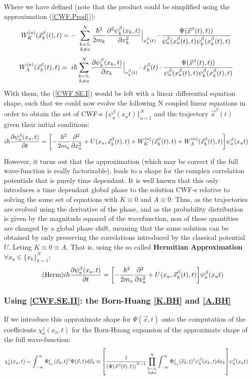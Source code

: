 \documentclass[11pt, a4paper]{article} %
\begin{document}
Where we have defined (note that the product could be simplified using the approximation (\ref{CWF.Prod})):
$$
W^{(a)}_K(\vec{x}_b^\beta (t),t)=- \ \sum_{\substack{k=1; \\ k\neq a}}^{N} \frac{\hbar^2}{2m_k}\pdv[2]{\psi_k^\beta(x_k,t)}{x_k}\Big\rvert_{x_k^\beta(t)}\cdot\frac{\Psi(\vec{x}^\beta(t),t))}{\psi^\beta_a(x_a^\beta(t),t) \psi^\beta_k(x_k^\beta(t),t)} 
$$
$$
W^{(a)}_A(\vec{x}_b^\beta (t),t)=\ i\hbar \sum_{\substack{k=1; \\ k\neq a}}^{N} \pdv{\psi_k^\beta(x_k,t)}{x_k}\Big\rvert_{x_k^\beta(t)}\cdot \dot{x}_k^\beta(t) \cdot\frac{\Psi(\vec{x}^\beta(t),t))}{\psi^\beta_a(x_a^\beta(t),t) \psi^\beta_k(x_k^\beta(t),t)}
$$
With them, the (\ref{CWF.SE.I}) would be left with a linear differential equation shape, such that we could now evolve the following N coupled linear equations in order to obtain the set of CWF-s $\{\psi_a^\beta(x_a t) \}_{a=1}^N$ and the trajectory $\vec{x}^\beta(t)$ given their initial conditions:
$$
i\hbar \pdv{\psi_a^\beta(x_a, t)}{t} = \qty[- \frac{\hbar^2}{2m_a}\pdv[2]{}{x_a} + U(x_a, \vec{x}_b^\beta(t), t)+ W^{(a)}_K(\vec{x}_b^\beta (t),t) +W^{(a)}_A(\vec{x}_b^\beta (t),t) ]\psi_a^\beta(x_a t)
$$

However, it turns out that the approximation (which may be correct if the full wave-function is really factorizable), leads to a shape for the complex correlation potentials that is purely time dependant. It is well known that this only introduces a time dependant global phase to the solution CWF-s relative to solving the same set of equations with $K\equiv 0$ and $A \equiv 0$. Thus, as the trajectories are evolved using the derivative of the phase, and as the probability distribution is given by the magnitude squared of the wavefunction, non of these quantities are changed by a global phase shift, meaning that the same solution can be obtained by only preserving the correlations introduced by the classical potential $U$. Leting $K\equiv 0 \equiv A$. That is, using the so called {\bf Hermitian Approximation} $\forall x_a \in \{ x_k\}_{k=1}^N$:
\begin{equation}\label{Herm}\tag{Herm}
i\hbar \pdv{\psi_a^\beta(x_a, t)}{t} = \qty[- \frac{\hbar^2}{2m_a}\pdv[2]{}{x_a} + U(x_a, \vec{x}_b^\beta(t), t)]\psi_a^\beta(x_a t)
\end{equation}

\subsubsection{Using \ref{CWF.SE.II}: the Born-Huang \ref{K.BH} and \ref{A.BH}}
If we introduce this approximate shape for $\Psi(\vec{x},t)$ onto the computation of the coefficients $\chi_a^j(x_a,t)$ for the Born-Huang expansion of the approximate shape of the full wave-function:
$$
\chi_a^j(x_a,t)= \int_{-\infty}^\infty \Phi_{x_a}^j(\vec{x}_b,t)^\dagger \Psi(\vec{x},t) d\vec{x}_b \simeq \qty[\frac{1}{ \qty(\Psi(\vec{x}^\beta(t),t))^{N-1}}\prod_{\substack{k=1; \\ k\neq a}}^{N} \int_{-\infty}^\infty \Phi_{x_a}^j(\vec{x}_b,t)^\dagger \psi^\beta_k(x_k,t) dx_k ] \psi_a^\beta(x_a t)
$$
\end{document}
